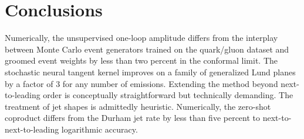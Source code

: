 \section{Conclusions}\label{sec:conclusions}

Numerically, the unsupervised one-loop amplitude differs from the
interplay between Monte Carlo event generators trained on the
quark/gluon dataset and groomed event weights by less than two percent
in the conformal limit. The stochastic neural tangent kernel improves on
a family of generalized Lund planes by a factor of 3 for any number of
emissions. Extending the method beyond next-to-leading order is
conceptually straightforward but technically demanding. The treatment of
jet shapes is admittedly heuristic. Numerically, the zero-shot coproduct
differs from the Durham jet rate by less than five percent to
next-to-next-to-leading logarithmic accuracy.

